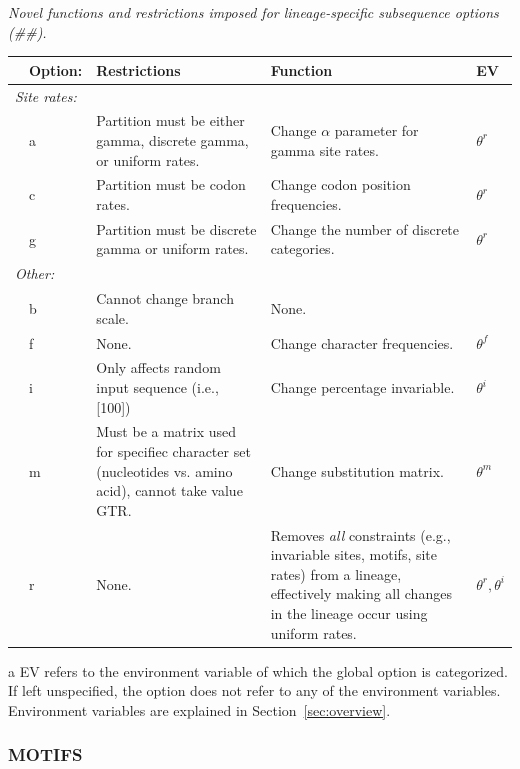 \documentclass[10pt]{article}
\begin{document}
 \begin{threeparttable}
  \caption{\textit{Novel functions and restrictions imposed for lineage-specific subsequence options (\#\#).}}
  \begin{tabular}{p{0.1in}lp{2.25in}p{2.25in}p{0.5in}}
  \hline\hline
  & Option: & Restrictions & Function & EV\tnote{a}\\
  \hline
   \multicolumn{4}{l}{\it Site rates:} \\
   & a & Partition must be either gamma, discrete gamma, or uniform rates. & Change $\alpha$ parameter for gamma site rates. & $\theta^r$\\
   & c & Partition must be codon rates. & Change codon position frequencies. & $\theta^r$\\
   & g & Partition must be discrete gamma or uniform rates. & Change the number of discrete categories. & $\theta^r$\\
   \multicolumn{4}{l}{\it Other:} \\
   & b & Cannot change branch scale. & None. \\
   & f & None. & Change character frequencies. & $\theta^f$\\
   & i & Only affects random input sequence (i.e., [100]) & Change percentage invariable. & $\theta^i$\\
   & m & Must be a matrix used for specifiec character set (nucleotides vs. amino acid), cannot take value GTR. & Change substitution matrix. & $\theta^m$\\
   & r & None. & Removes \emph{all} constraints (e.g., invariable sites, motifs, site rates) from a lineage, effectively making all changes in the lineage occur using uniform rates. & $\theta^r, \theta^i$\\
  \hline\hline
  \end{tabular}
  \begin{tablenotes}
  \item[a] EV refers to the environment variable of which the global option is categorized. If left unspecified, the option does not refer to any of the environment variables. Environment variables are explained in Section~\ref{sec:overview}.
  \end{tablenotes}
  \label{tab:lineage_options}
 \end{threeparttable}
 
 \subsubsection{MOTIFS}
\end{document}

